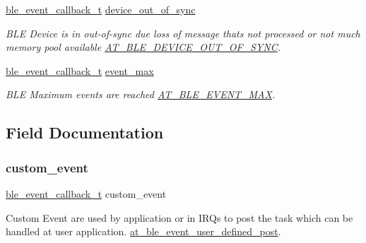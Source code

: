 \begin{DoxyCompactItemize}
\mbox{\hyperlink{ble__manager_8h_a04ce4bb8cb8282f2762e3924b1773cc9}{ble\+\_\+event\+\_\+callback\+\_\+t}} \mbox{\hyperlink{structble__custom__event__cb_af8a4fcc9e342ecba89cc4f9fdb31d78a}{device\+\_\+out\+\_\+of\+\_\+sync}}
\begin{DoxyCompactList}\small\item\em B\+LE Device is in out-\/of-\/sync due loss of message that\textquotesingle{}s not processed or not much memory pool available \mbox{\hyperlink{at__ble__api_8h_a3324640b95f33169515f89738ed5baebae0cc8d4f98e3215ec1d3b43e8fac6d46}{A\+T\+\_\+\+B\+L\+E\+\_\+\+D\+E\+V\+I\+C\+E\+\_\+\+O\+U\+T\+\_\+\+O\+F\+\_\+\+S\+Y\+NC}}. \end{DoxyCompactList}\item 
\mbox{\hyperlink{ble__manager_8h_a04ce4bb8cb8282f2762e3924b1773cc9}{ble\+\_\+event\+\_\+callback\+\_\+t}} \mbox{\hyperlink{structble__custom__event__cb_a2a03c6107197035010df31d1c99e4100}{event\+\_\+max}}
\begin{DoxyCompactList}\small\item\em B\+LE Maximum events are reached \mbox{\hyperlink{at__ble__api_8h_a3324640b95f33169515f89738ed5baeba6ec96e354e65e3d209e0873eb5ae1a90}{A\+T\+\_\+\+B\+L\+E\+\_\+\+E\+V\+E\+N\+T\+\_\+\+M\+AX}}. \end{DoxyCompactList}\end{DoxyCompactItemize}


\subsection{Field Documentation}
\mbox{\label{structble__custom__event__cb_a7dcbd675e80d7e2b00fef81e694db3d3}} 
\subsubsection{\texorpdfstring{custom\_event}{custom\_event}}
{\footnotesize\ttfamily \mbox{\hyperlink{ble__manager_8h_a04ce4bb8cb8282f2762e3924b1773cc9}{ble\+\_\+event\+\_\+callback\+\_\+t}} custom\+\_\+event}



Custom Event are used by application or in I\+RQ\textquotesingle{}s to post the task which can be handled at user application. \mbox{\hyperlink{group__misc__group_gadc0a033c5b84eee9ffd4c6c394be2520}{at\+\_\+ble\+\_\+event\+\_\+user\+\_\+defined\+\_\+post}}. 

